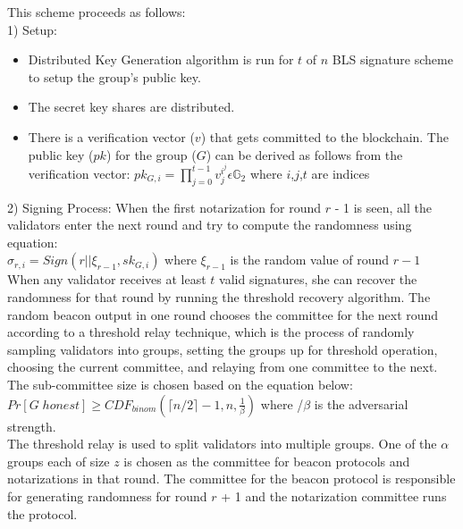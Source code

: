 \documentclass[10pt,journal,compsoc]{IEEEtran}
\begin{document}
This scheme proceeds as follows: 
\\
1) Setup:
    \begin{itemize}
        \item Distributed Key Generation algorithm is run for $t$ of \indent $n$ BLS signature scheme to setup the group's public key. 
        \item The secret key shares are distributed. 
        \item There is a verification vector ($v$) that gets committed \indent to the blockchain. The public key ($pk$) for the group ($G$) can be derived as follows from the verification vector: $pk_{G,i} = \prod_{j=0}^{t-1} v_j^{i^j} \epsilon  \mathbb{G}_2 $ where $i$,$j$,$t$ are indices
    \end{itemize}
2) Signing Process: When the first notarization for round $r$ - 1 is seen, all the validators enter the next round and try to compute the randomness using equation: 
\\ \indent \indent $\sigma_{r,i} = Sign (r || \xi_{r-1},sk_{G,i})$ where $\xi_{r-1}$ is the random \indent \indent value of round $r-1$
\\
When any validator receives at least $t$ valid signatures, she can recover the randomness for that round by running the threshold recovery algorithm. The random beacon output in one round chooses the committee for the next round according to a threshold relay technique, which is the process of randomly sampling validators into groups, setting the groups up for threshold operation, choosing the current committee, and relaying from one committee to the next.
The sub-committee size is chosen based on the equation below:
\\ \indent 
$Pr[G \; honest] \geq CDF_{binom}( \lceil{n/2} \rceil -1,n,\frac{1}{\beta})$ where /$\beta$ is the adversarial strength.
\\
The threshold relay is used to split validators into multiple groups. One of the $\alpha$ groups each of size $z$ is chosen as the committee for beacon protocols and notarizations in that round. The committee for the beacon protocol is responsible for generating randomness for round $r$ + 1 and the notarization committee runs the protocol. 
\end{document}
